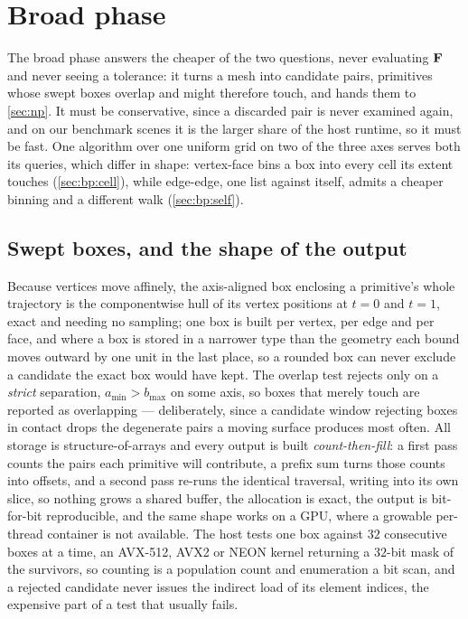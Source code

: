 \section{Broad phase}
\label{sec:bp}

The broad phase answers the cheaper of the two questions, never evaluating
$\mathbf{F}$ and never seeing a tolerance: it turns a mesh into candidate pairs,
primitives whose swept boxes overlap and might therefore touch, and hands them to
\cref{sec:np}. It must be conservative, since a discarded pair is never examined
again, and on our benchmark scenes it is the larger share of the host runtime, so
it must be fast. One algorithm over one uniform grid on two of the three axes
serves both its queries, which differ in shape: vertex-face bins a box into every
cell its extent touches (\cref{sec:bp:cell}), while edge-edge, one list against
itself, admits a cheaper binning and a different walk (\cref{sec:bp:self}).

\subsection{Swept boxes, and the shape of the output}
\label{sec:bp:common}

Because vertices move affinely, the axis-aligned box enclosing a primitive's
whole trajectory is the componentwise hull of its vertex positions at $t=0$ and
$t=1$, exact and needing no sampling; one box is built per vertex, per edge and
per face, and where a box is stored in a narrower type than the geometry each
bound moves outward by one unit in the last place, so a rounded box can never
exclude a candidate the exact box would have kept. The overlap test rejects only
on a \emph{strict} separation, $a_{\min} > b_{\max}$ on some axis, so boxes that
merely touch are reported as overlapping --- deliberately, since a candidate
window rejecting boxes in contact drops the degenerate pairs a moving surface
produces most often. All storage is structure-of-arrays and every output is
built \emph{count-then-fill}: a first pass counts the pairs each primitive will
contribute, a prefix sum turns those counts into offsets, and a second pass
re-runs the identical traversal, writing into its own slice, so nothing grows a
shared buffer, the allocation is exact, the output is bit-for-bit reproducible,
and the same shape works on a GPU, where a growable per-thread container is not
available. The host tests one box against $32$ consecutive boxes at a time, an
AVX-512, AVX2 or NEON kernel returning a $32$-bit mask of the survivors, so
counting is a population count and enumeration a bit scan, and a rejected
candidate never issues the indirect load of its element indices, the expensive
part of a test that usually fails.

